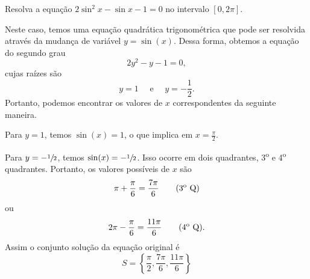 \begin{example}
  Resolva a equação  $2\sin^2 x - \sin x - 1 = 0$ no intervalo $[0, 2\pi]$.

  \solution
  Neste caso, temos uma equação quadrática trigonométrica que pode ser
  resolvida através da mudança de variável $y = \sin(x)$. Dessa forma, obtemos
  a equação do segundo grau
  \[
    2y^2  - y - 1 = 0,
  \]
  cujas raízes são
  \[
    y = 1
    \quad\text{ e }\quad
    y = -\frac{1}{2}.
  \]
  Portanto, podemos encontrar os valores de $x$
  correspondentes da seguinte maneira.

  Para $y = 1$, temos $\sin(x) = 1$, o que implica em
  \(
    x = \frac{\pi}{2}.
  \)

  Para $y = -\sfrac{1}{2}$, temos $\sin(x) = -\sfrac{1}{2}$.
  Isso ocorre em dois
  quadrantes, 3\textsuperscript{o} e 4\textsuperscript{o} quadrantes.
  Portanto, os valores
  possíveis de $x$ são
  \[
    \pi + \frac{\pi}{6} = \frac{7\pi}{6}
    \qquad \text{(3\textsuperscript{o} Q)}
  \]
  ou
  \[
    2\pi - \frac{\pi}{6} = \frac{11\pi}{6}
    \qquad \text{(4\textsuperscript{o} Q)}.
  \]
  Assim o conjunto solução da equação original é
  \[
    S = \left\{ \frac{\pi}{2}, \frac{7\pi}{6}, \frac{11\pi}{6} \right\}
  \]
\end{example}

